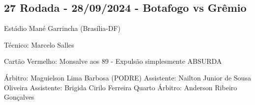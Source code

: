 \newpage
\subsection{27 Rodada - 28/09/2024 - Botafogo vs Grêmio}

\begin{figure}[H]
    \centering
    
\end{figure}

Estádio Mané Garrincha (Brasília-DF)

Técnico: Marcelo Salles

Cartão Vermelho: Monsalve aos 89 - Expulsão simplesmente ABSURDA

Árbitro: Maguielson Lima Barbosa (PODRE)
Assistente: Nailton Junior de Sousa Oliveira
Assistente: Brigida Cirilo Ferreira
Quarto Árbitro: Anderson Ribeiro Gonçalves
